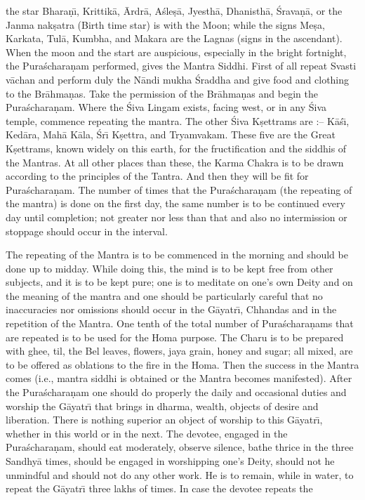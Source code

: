 the star Bhara\d{n}\={\i}, Krittik\=a, \=Ardr\=a, A\'sle\d{s}\=a, Jyesth\=a, Dhanisth\=a, \'Srava\d{n}\=a, or the Janma nak\d{s}atra (Birth time star) is with the Moon; while the signs Me\d{s}a, Karkata, Tul\=a, Kumbha, and Makara are the Lagnas (signs in the ascendant). When the moon and the start are auspicious, especially in the bright fortnight, the Pura\'schara\d{n}am performed, gives the Mantra Siddhi. First of all repeat Svasti v\=achan and perform duly the N\=andi mukha \'Sraddha and give food and clothing to the Br\=ahma\d{n}as. Take the permission of the Br\=ahma\d{n}as and begin the Pura\'schara\d{n}am. Where the \'Siva Lingam exists, facing west, or in any \'Siva temple, commence repeating the mantra. The other \'Siva K\d{s}ettrams are :-- K\=a\'s\={\i}, Ked\=ara, Mah\=a K\=ala, \'Sr\={\i} K\d{s}ettra, and Tryamvakam. These five are the Great K\d{s}ettrams, known widely on this earth, for the fructification and the siddhis of the Mantras. At all other places than these, the Karma Chakra is to be drawn according to the principles of the Tantra. And then they will be fit for Pura\'schara\d{n}am. The number of times that the Pura\'schara\d{n}am (the repeating of the mantra) is done on the first day, the same number is to be continued every day until completion; not greater nor less than that and also no intermission or stoppage should occur in the interval.

The repeating of the Mantra is to be commenced in the morning and should be done up to midday. While doing this, the mind is to be kept free from other subjects, and it is to be kept pure; one is to meditate on one's own Deity and on the meaning of the mantra and one should be particularly careful that no inaccuracies nor omissions should occur in the G\=ayatr\={\i}, Chhandas and in the repetition of the Mantra. One tenth of the total number of Pura\'schara\d{n}ams that are repeated is to be used for the Homa purpose. The Charu is to be prepared with ghee, til, the Bel leaves, flowers, jaya grain, honey and sugar; all mixed, are to be offered as oblations to the fire in the Homa. Then the success in the Mantra comes (i.e., mantra siddhi is obtained or the Mantra becomes manifested). After the Pura\'schara\d{n}am one should do properly the daily and occasional duties and worship the G\=ayatr\={\i} that brings in dharma, wealth, objects of desire and liberation. There is nothing superior an object of worship to this G\=ayatr\={\i}, whether in this world or in the next. The devotee, engaged in the Pura\'schara\d{n}am, should eat moderately, observe silence, bathe thrice in the three Sandhy\=a times, should be engaged in worshipping one's Deity, should not he unmindful and should not do any other work. He is to remain, while in water, to repeat the G\=ayatr\={\i} three lakhs of times. In case the devotee repeats the

